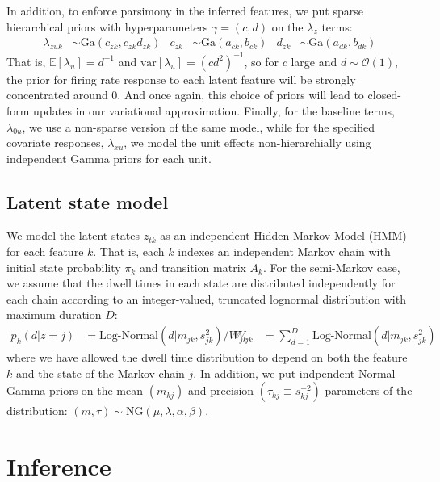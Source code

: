 \documentclass{article} %
\begin{document}
In addition, to enforce parsimony in the inferred features, we put sparse hierarchical priors with hyperparameters $\gamma = (c, d)$ on the $\lambda_z$ terms:
\begin{align}
    \label{hierarchy}
    \lambda_{zuk} &\sim \text{Ga}(c_{zk}, c_{zk} d_{zk}) & c_{zk} &\sim \text{Ga}(a_{ck}, b_{ck})
    & d_{zk} &\sim \text{Ga}(a_{dk}, b_{dk})
\end{align}
That is, $\mathbb{E}[\lambda_u] = d^{-1}$ and $\text{var}[\lambda_u] = (cd^2)^{-1}$, so for $c$ large and $d\sim \mathcal{O}(1)$, the prior for firing rate response to each latent feature will be strongly concentrated around 0. And once again, this choice of priors will lead to closed-form updates in our variational approximation. Finally, for the baseline terms, $\lambda_{0u}$, we use a non-sparse version of the same model, while for the specified covariate responses, $\lambda_{xu}$, we model the unit effects non-hierarchially using independent Gamma priors for each unit.

\subsection{Latent state model}
We model the latent states $z_{tk}$ as an independent Hidden Markov Model (HMM) for each feature $k$. That is, each $k$ indexes an independent Markov chain with initial state probability $\pi_k$ and transition matrix $A_k$. For the semi-Markov case, we assume that the dwell times in each state are distributed independently for each chain according to an integer-valued, truncated lognormal distribution with maximum duration $D$:
\begin{align}
    \label{semi-markov}
    p_k(d|z = j) &= \text{Log-Normal}(d|m_{jk}, s^2_{jk}) / W_{jk}  &
    W_{jk} &= \sum_{d = 1}^D \text{Log-Normal}(d|m_{jk}, s^2_{jk}) 
\end{align}
where we have allowed the dwell time distribution to depend on both the feature $k$ and the state of the Markov chain $j$. In addition, we put indpendent Normal-Gamma priors on the mean $(m_{kj})$ and precision $(\tau_{kj} \equiv s_{kj}^{-2})$ parameters of the distribution: $(m, \tau) \sim \text{NG}(\mu, \lambda, \alpha, \beta)$.

\section{Inference}
\end{document}
